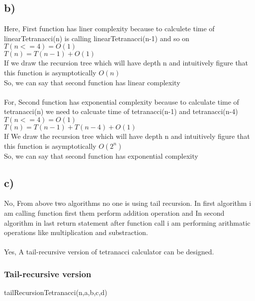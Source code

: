 \documentclass[10pt, a4paper]{article}
\begin{document}
    \subsection*{b)}
    {Here, First function has liner complexity because to calculete time of linearTetranacci(n) is calling linearTetranacci(n-1) and so on\\}
    {$T(n<=4) = O(1)$\\}
    {$T(n) = T(n-1) + O(1)$} \\
    {If we draw the recursion tree which will have depth n and intuitively figure that this function is asymptotically $O(n)$\\}
    {So, we can say that second function has linear complexity\\\\}
    {For, Second function has exponential complexity because to calculate time of tetranacci(n) we need to calcuate time of tetranacci(n-1) and tetranacci(n-4) \\}
    {$T(n<=4) = O(1)$\\}
    {$T(n) = T(n-1) + T(n-4) + O(1)$} \\
    {If We draw the recursion tree which will have depth n and intuitively figure that this function is asymptotically $O(2^n)$\\}
    {So, we can say that second function has exponential complexity}
    
    
    \subsection*{c)}
    {No, From above two algorithms no one is using tail recursion. In first algorithm i am calling function first them perform addition operation and In second algorithm in last return statement after function call i am performing arithmatic operations like multiplication and substraction.\\\\}
    {Yes, A tail-recursive version of tetranacci calculator can be designed.}
    \subsubsection*{Tail-recursive version}
    {\SetAlgoNoLine%
    \begin{algorithm}
        
            \DontPrintSemicolon %
            
            
        \EndFunction
        \caption{tailRecursionTetranacci(n,a,b,c,d)}
    \end{algorithm}}%
    
\end{document}
